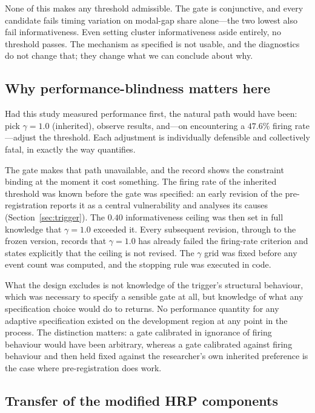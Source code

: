 \documentclass[12pt,letterpaper]{article}
\begin{document}
None of this makes any threshold admissible. The gate is conjunctive, and every
candidate fails timing variation on modal-gap share alone---the two lowest also fail
informativeness. Even setting cluster informativeness aside entirely, no threshold
passes. The mechanism as specified is not usable, and the diagnostics do not change
that; they change what we can conclude about why.

\subsection{Why performance-blindness matters here}

Had this study measured performance first, the natural path would have been: pick
$\gamma = 1.0$ (inherited), observe results, and---on encountering a $47.6\%$ firing
rate---adjust the threshold. Each adjustment is individually defensible and
collectively fatal, in exactly the way \citet{nikolopoulos2026} quantifies.

The gate makes that path unavailable, and the record shows the constraint binding at
the moment it cost something. The firing rate of the inherited threshold was known
before the gate was specified: an early revision of the pre-registration reports it
as a central vulnerability and analyses its causes (Section~\ref{sec:trigger}). The $0.40$
informativeness ceiling was then set in full knowledge that $\gamma = 1.0$ exceeded it.
Every subsequent revision, through to the frozen version, records that $\gamma = 1.0$ has
already failed the firing-rate criterion and states explicitly that the ceiling is
not revised. The $\gamma$ grid was fixed before any event count was computed, and the
stopping rule was executed in code.

What the design excludes is not knowledge of the trigger's structural behaviour,
which was necessary to specify a sensible gate at all, but knowledge of what any
specification choice would do to returns. No performance quantity for any adaptive
specification existed on the development region at any point in the process. The
distinction matters: a gate calibrated in ignorance of firing behaviour would have
been arbitrary, whereas a gate calibrated against firing behaviour and then held
fixed against the researcher's own inherited preference is the case where
pre-registration does work.

\subsection{Transfer of the modified HRP components}
\end{document}
